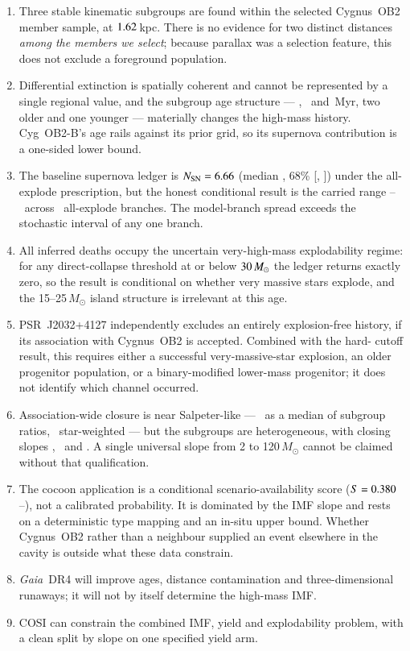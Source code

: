 \documentclass{aa}
\begin{document}
\begin{enumerate}
\item Three stable kinematic subgroups are found within the selected Cygnus~OB2
      member sample, at $1.62$\,kpc. There is no evidence for two
      distinct distances \emph{among the members we select}; because parallax
      was a selection feature, this does not exclude a foreground population.
\item Differential extinction is spatially coherent and cannot be represented by
      a single regional value, and the subgroup age structure --- \ageA, \ageB\
      and \ageC\,Myr, two older and one younger --- materially changes the
      high-mass history. Cyg~OB2-B's age rails against its prior grid, so its
      supernova contribution is a one-sided lower bound.
\item The baseline supernova ledger is $N_{\rm SN} = 6.66$ (median \NSNmedian,
      68\% [\NSNlo, \NSNhi]) under the all-explode prescription, but the honest
      conditional result is the carried range \NSNheadlo--\NSNheadhi\ across
      \NSNheadbranches\ all-explode branches. The
      model-branch spread exceeds the stochastic interval of any one branch.
\item All inferred deaths occupy the uncertain very-high-mass explodability
      regime: for any direct-collapse threshold at or below $30\,M_\odot$
      the ledger returns exactly zero, so the result is conditional on whether
      very massive stars explode, and the 15--25\,$M_\odot$ island structure is
      irrelevant at this age.
\item PSR~J2032+4127 independently excludes an entirely explosion-free history,
      if its association with Cygnus~OB2 is accepted. Combined with the hard-
      cutoff result, this requires either a successful very-massive-star
      explosion, an older progenitor population, or a binary-modified lower-mass
      progenitor; it does not identify which channel occurred.
\item Association-wide closure is near Salpeter-like --- \closureMedianRatios\ as
      a median of subgroup ratios, \closureWeighted\ star-weighted --- but the
      subgroups are heterogeneous, with closing slopes \closingAlphaA,
      \closingAlphaB\ and \closingAlphaC. A single universal slope from 2 to
      120\,$M_\odot$ cannot be claimed without that qualification.
\item The cocoon application is a conditional scenario-availability score
      ($S = 0.380$--\Pverdicthi), not a calibrated probability. It is
      dominated by the IMF slope and rests on a deterministic type mapping and
      an in-situ upper bound. Whether Cygnus~OB2 rather than a neighbour
      supplied an event elsewhere in the cavity is outside what these data
      constrain.
\item \textit{Gaia}~DR4 will improve ages, distance contamination and
      three-dimensional runaways; it will not by itself determine the high-mass
      IMF.
\item COSI can constrain the combined IMF, yield and explodability problem, with
      a clean split by slope on one specified yield arm.
\end{enumerate}
\end{document}
